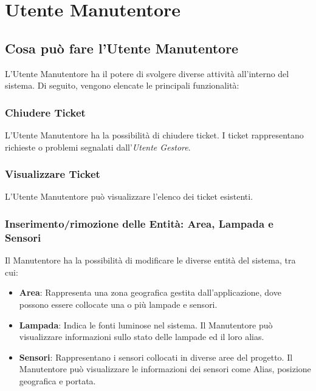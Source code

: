 \chapter{Utente Manutentore}

\section{Cosa può fare l'Utente Manutentore}
L'Utente Manutentore ha il potere di svolgere diverse attività all'interno del sistema. Di seguito, vengono elencate le principali funzionalità:

\subsection{Chiudere Ticket}
L'Utente Manutentore ha la possibilità di chiudere ticket. 
I ticket rappresentano richieste o problemi segnalati dall'\textit{Utente Gestore}.

\subsection{Visualizzare Ticket}
L'Utente Manutentore può visualizzare l'elenco dei ticket esistenti. 

\subsection{Inserimento/rimozione delle Entità: Area, Lampada e Sensori}
Il Manutentore ha la possibilità di modificare le diverse entità del sistema, tra cui:
\begin{itemize}
\item \textbf{Area}: Rappresenta una zona geografica gestita dall'applicazione, dove possono essere collocate una o più lampade e sensori. 
\item \textbf{Lampada}: Indica le fonti luminose nel sistema. Il Manutentore può visualizzare informazioni sullo stato delle lampade ed il loro alias.
\item \textbf{Sensori}: Rappresentano i sensori collocati in diverse aree del progetto. Il Manutentore può visualizzare le informazioni dei sensori come Alias, posizione geografica e portata.
\end{itemize}